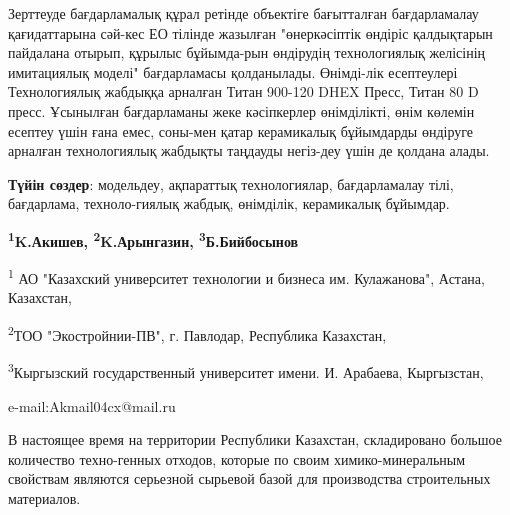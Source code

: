 Зерттеуде бағдарламалық құрал ретінде объектіге бағытталған
бағдарламалау қағидаттарына сәй-кес ЕО тілінде жазылған "өнеркәсіптік
өндіріс қалдықтарын пайдалана отырып, құрылыс бұйымда-рын өндірудің
технологиялық желісінің имитациялық моделі" бағдарламасы қолданылады.
Өнімді-лік есептеулері Технологиялық жабдыққа арналған Титан 900-120 DHEX
Пресс, Титан 80 D пресс. Ұсынылған бағдарламаны жеке кәсіпкерлер
өнімділікті, өнім көлемін есептеу үшін ғана емес, соны-мен қатар
керамикалық бұйымдарды өндіруге арналған технологиялық жабдықты таңдауды
негіз-деу үшін де қолдана алады.

{\bfseries Түйін сөздер}: модельдеу, ақпараттық технологиялар,
бағдарламалау тілі, бағдарлама, техноло-гиялық жабдық, өнімділік,
керамикалық бұйымдар.


\begin{center}
{\bfseries \textsuperscript{1}K.Акишев\envelope,
\textsuperscript{2}K.Арынгазин, \textsuperscript{3}Б.Бийбосынов}

\textsuperscript{1} АО "Казахский университет технологии и бизнеса им.
Кулажанова", Астана, Казахстан,

\textsuperscript{2}ТОО "Экостройнии-ПВ", г. Павлодар, Республика
Казахстан,

\textsuperscript{3}Кыргызский государственный университет имени. И.
Арабаева, Кыргызстан,

e-mail:Akmail04cx@mail.ru
\end{center}

В настоящее время на территории Республики Казахстан, складировано
большое количество техно-генных отходов, которые по своим
химико-минеральным свойствам являются серьезной сырьевой базой для
производства строительных материалов.

